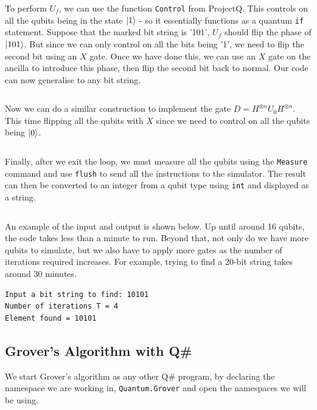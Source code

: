 To perform $U_f$, we can use the function \texttt{Control} from ProjectQ. This controls on all the qubits being in the state $\left\vert{1}\right\rangle$ - so it essentially functions as a quantum \texttt{if} statement. Suppose that the marked bit string is '101', $U_f$ should flip the phase of $\left\vert{101}\right\rangle$. But since we can only control on all the bits being '1', we need to flip the second bit using an $X$ gate. Once we have done this, we can use an $X$ gate on the ancilla to introduce this phase, then flip the second bit back to normal. Our code can now generalise to any bit string.

\inputminted[firstnumber=34, firstline=34, lastline=42]{python}{code/ProjectQ/grover_projectq_guide.txt}

Now we can do a similar construction to implement the gate $D = H^{\otimes n} U_0 H^{\otimes n}$. This time flipping all the qubits with $X$ since we need to control on all the qubits being $\left\vert{0}\right\rangle$. 

\inputminted[firstnumber=43, firstline=43, lastline=52]{python}{code/ProjectQ/grover_projectq_guide.txt}

Finally, after we exit the loop, we must measure all the qubits using the \texttt{Measure} command and use \texttt{flush} to send all the instructions to the simulator. The result can then be converted to an integer from a qubit type using \texttt{int} and displayed as a string.

\inputminted[firstnumber=54, firstline=54, lastline=59]{python}{code/ProjectQ/grover_projectq_guide.txt}

An example of the input and output is shown below. Up until around 16 qubits, the code takes less than a minute to run. Beyond that, not only do we have more qubits to simulate, but we also have to apply more gates as the number of iterations required increases. For example, trying to find a 20-bit string takes around 30 minutes.

\begin{verbatim}
Input a bit string to find: 10101
Number of iterations T = 4
Element found = 10101
\end{verbatim}

\subsection{Grover's Algorithm with Q\#}

We start Grover's algorithm as any other Q\# program, by declaring the namespace we are working in, \texttt{Quantum.Grover} and open the namespaces we will be using.

